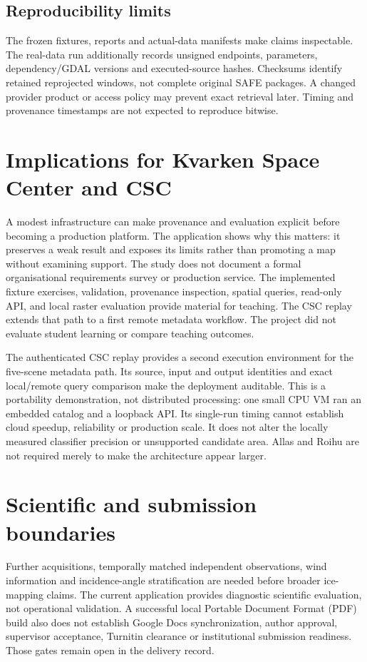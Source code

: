 \subsection{Reproducibility limits}

The frozen fixtures, reports and actual-data manifests make claims inspectable. The
real-data run additionally records unsigned endpoints, parameters, dependency/GDAL versions
and executed-source hashes. Checksums identify retained reprojected windows, not complete
original SAFE packages. A changed provider product or access policy may prevent exact
retrieval later. Timing and provenance timestamps are not expected to reproduce bitwise.

\section{Implications for Kvarken Space Center and CSC}

A modest infrastructure can make provenance and evaluation explicit before becoming a
production platform. The application shows why this matters: it preserves a weak result
and exposes its limits rather than promoting a map without examining support.
The study does not document a formal organisational requirements survey or production service.
The implemented fixture exercises, validation, provenance inspection, spatial queries,
read-only API, and local raster evaluation provide material for teaching. The CSC replay
extends that path to a first remote metadata workflow. The project did not evaluate student
learning or compare teaching outcomes.

The authenticated CSC replay provides a second execution environment for the five-scene
metadata path. Its source, input and output identities and exact local/remote query
comparison make the deployment auditable. This is a portability demonstration, not
distributed processing: one small CPU VM ran an embedded catalog and a loopback API.
Its single-run timing cannot establish cloud speedup, reliability or production scale.
It does not alter the locally measured classifier precision or unsupported candidate area.
Allas and Roihu are not required merely to make the architecture appear larger.

\section{Scientific and submission boundaries}

Further acquisitions, temporally matched independent observations, wind information and
incidence-angle stratification are needed before broader ice-mapping claims. The current
application provides diagnostic scientific evaluation, not operational validation.
A successful local Portable Document Format (PDF) build also does not establish Google Docs synchronization, author
approval, supervisor acceptance, Turnitin clearance or institutional submission readiness.
Those gates remain open in the delivery record.
